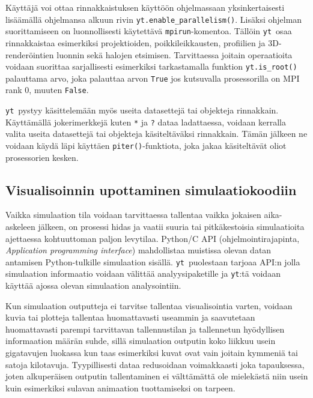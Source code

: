 \documentclass[12pt,a4paper]{article}
\newcommand{\yt}{\texttt{yt}}
\begin{document}
Käyttäjä voi ottaa rinnakkaistuksen käyttöön ohjelmassaan yksinkertaisesti lisäämällä ohjelmansa alkuun rivin \texttt{yt.enable\_parallelism()}. Lisäksi ohjelman suorittamiseen on luonnollisesti käytettävä \texttt{mpirun}-komentoa. Tällöin \yt\ osaa rinnakkaistaa esimerkiksi projektioiden, poikkileikkausten, profiilien ja 3D-renderöintien luonnin sekä halojen etsimisen. Tarvittaessa joitain operaatioita voidaan suorittaa sarjallisesti esimerkiksi tarkastamalla funktion \texttt{yt.is\_root()} palauttama arvo, joka palauttaa arvon \texttt{True} jos kutsuvalla prosessorilla on MPI rank 0, muuten \texttt{False}. \cite{yt, parallel}

\yt\ pystyy käsittelemään myös useita datasettejä tai objekteja rinnakkain. Käyttämällä jokerimerkkejä kuten \texttt{*} ja \texttt{?} dataa ladattaessa, voidaan kerralla valita useita datasettejä tai objekteja käsiteltäväksi rinnakkain. Tämän jälkeen ne voidaan käydä läpi käyttäen \texttt{piter()}-funktiota, joka jakaa käsiteltävät oliot prosessorien kesken. \cite{parallel} %

\subsection{Visualisoinnin upottaminen simulaatiokoodiin}
Vaikka simulaation tila voidaan tarvittaessa tallentaa vaikka jokaisen aika-askeleen jälkeen, on prosessi hidas ja vaatii suuria tai pitkäkestoisia simulaatioita ajettaessa kohtuuttoman paljon levytilaa. Python/C API (ohjelmointirajapinta, \textit{Application programming interface}) mahdollistaa muistissa olevan datan antamisen Python-tulkille simulaation sisällä. \yt\ puolestaan tarjoaa API:n jolla simulaation informaatio voidaan välittää analyysipaketille ja \yt :tä voidaan käyttää ajossa olevan simulaation analysointiin. \cite{yt}

Kun simulaation outputteja ei tarvitse tallentaa visualisointia varten, voidaan kuvia tai plotteja tallentaa huomattavasti useammin ja saavutetaan huomattavasti parempi tarvittavan tallennustilan ja tallennetun hyödyllisen informaation määrän suhde, sillä simulaation outputin koko liikkuu usein gigatavujen luokassa kun taas esimerkiksi kuvat ovat vain joitain kymmeniä tai satoja kilotavuja. Tyypillisesti dataa redusoidaan voimakkaasti joka tapauksessa, joten alkuperäisen outputin tallentaminen ei välttämättä ole mielekästä niin usein kuin esimerkiksi sulavan animaation tuottamiseksi on tarpeen. \cite{yt}
\end{document}
